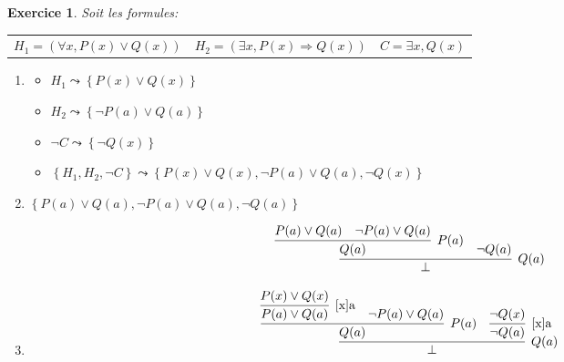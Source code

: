 \documentclass{article}
\theoremstyle{plain}
\newtheorem{exo}{Exercice}%
\begin{document}
\begin{exo} Soit les formules:
\begin{center}
    \begin{tabular}{c c c}
        $H_1 = (\forall x, P(x) \vee Q(x))$ &
        $H_2 = (\exists x, P(x) \Rightarrow Q(x))$ &
        $C = \exists x, Q(x) $\\
    \end{tabular}
\end{center}

\begin{enumerate}
    \item
    \begin{itemize}
        \item $H_1 \leadsto \left\{P(x) \vee Q(x)\right\}$
        \item $H_2 \leadsto \left\{\neg P(a) \vee Q(a)\right\}$
        \item $\neg C \leadsto \left\{\neg Q(x)\right\}$
        \item $\left\{H_1, H_2, \neg C \right\} \leadsto
                \left\{P(x) \vee Q(x), \neg P(a) \vee Q(a), \neg Q(x)\right\}$
    \end{itemize}

    \item $\left\{P(a) \vee Q(a), \neg P(a) \vee Q(a), \neg Q(a)\right\}$

    \[
        \infer[Q(a)]{\bot}{
            \infer[P(a)]{Q(a)}
            {P(a) \vee Q(a) & \neg P(a) \vee Q(a)}
            &
            \neg Q(a)
        }
    \]

    \item \[
        \infer[Q(a)]{\bot}{
         \infer[P(a)]{Q(a)}
          {\infer[\text{[x]a}]{P(a) \vee Q(a)}{P(x) \vee Q(x)}
          & \neg P(a) \vee Q(a)
          }
         &
         \infer[\text{[x]a}]{\neg Q(a)}{\neg Q(x)}
        }
    \]
\end{enumerate}
\end{exo}
\end{document}
